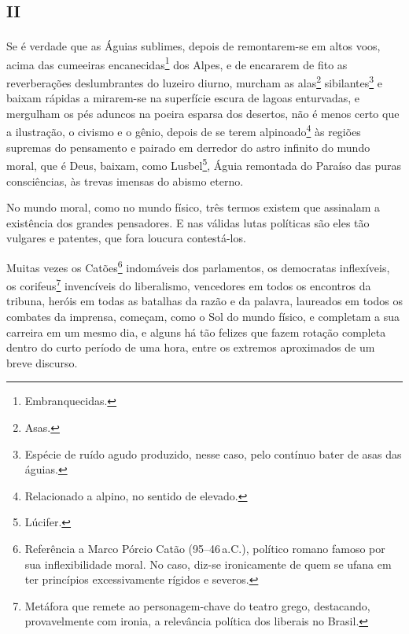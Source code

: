 
\section{\textsc{ii}}

Se é verdade que as Águias sublimes, depois de remontarem-se em altos
voos, acima das cumeeiras encanecidas\footnote{Embranquecidas.} dos
Alpes, e de encararem de fito as reverberações deslumbrantes do luzeiro
diurno, murcham as alas\footnote{Asas.} sibilantes\footnote{Espécie
  de ruído agudo produzido, nesse caso, pelo contínuo bater de asas das
  águias.} e baixam rápidas a mirarem-se na superfície escura de lagoas
enturvadas, e mergulham os pés aduncos na poeira esparsa dos desertos,
não é menos certo que a ilustração, o civismo e o gênio, depois de se
terem alpinoado\footnote{Relacionado a alpino, no sentido de elevado.}
às regiões supremas do pensamento e pairado em derredor do astro
infinito do mundo moral, que é Deus, baixam, como Lusbel\footnote{Lúcifer.}, 
Águia remontada do Paraíso das puras consciências, às
trevas imensas do abismo eterno.

No mundo moral, como no mundo físico, três termos existem que assinalam
a existência dos grandes pensadores. E nas válidas lutas políticas são
eles tão vulgares e patentes, que fora loucura contestá-los.

Muitas vezes os Catões\footnote{Referência a Marco Pórcio Catão (95--46\,a.C.), 
político romano famoso por sua inflexibilidade moral. No
  caso, diz-se ironicamente de quem se ufana em ter princípios
  excessivamente rígidos e severos.\label{marco}} indomáveis dos parlamentos, os
democratas inflexíveis, os corifeus\footnote{Metáfora que remete ao
  personagem-chave do teatro grego, destacando, provavelmente com
  ironia, a relevância política dos liberais no Brasil.} invencíveis do
liberalismo, vencedores em todos os encontros da tribuna, heróis em
todas as batalhas da razão e da palavra, laureados em todos os combates
da imprensa, começam, como o Sol do mundo físico, e completam a sua
carreira em um mesmo dia, e alguns há tão felizes que fazem rotação
completa dentro do curto período de uma hora, entre os extremos
aproximados de um breve discurso.

